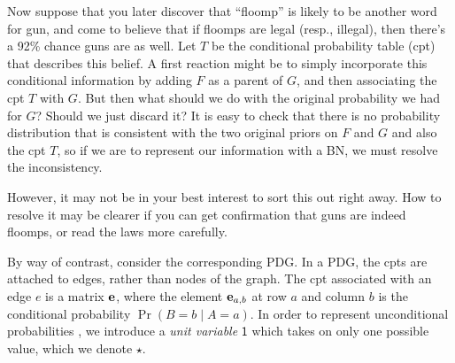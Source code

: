 \documentclass{article}
\newcommand{\MN}{PDG}
\numberwithin{equation}{section}
\begin{document}
\begin{example}
		Now suppose that you later discover that ``floomp'' is likely to be another word for gun, and come to believe that if floomps are legal (resp., illegal), then there's a 92\% chance guns are as well.
		Let $T$ be the conditional probability table (cpt) that describes this belief.
		A first reaction might be to simply incorporate this conditional information by
		adding $F$ as a parent of $G$, and then associating the cpt $T$ with $G$.
		But then what should we do with the original probability we had
		for $G$?  Should we just discard it?
		It is easy to check that there is no probability distribution that is
		consistent with the two original priors on $F$ and $G$ and also the cpt
		$T$, so if we are to represent our information with a BN, we must
		resolve the inconsistency.  
			
			
		However, it may not be in your best interest to sort this out right away.
		How to resolve it may be clearer if you can get confirmation
		that guns are indeed floomps, or read the laws more carefully.


		By way of contrast, consider the corresponding \MN. In a \MN, the cpts
		are attached to edges, rather than nodes of the graph.  
		The cpt associated with an edge $e$ is a matrix
		$\mathbf e$, where the element $\mathbf e_{a,b}$ at row $a$ and column $b$
		is the conditional probability $\Pr(B \!\!=\!\!b \mid A \!\!=\!\! a)$.  
		In order to represent unconditional probabilities%
		, we introduce a \emph{unit variable} $\mathsf 1$ %
		which takes on only one possible value,	which we denote $\star$.
		

\end{example}
\end{document}
